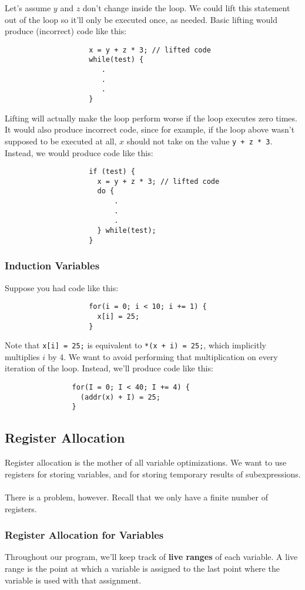 \documentclass[]{article}
\theoremstyle{definition}
\begin{document}
				Let's assume $y$ and $z$ don't change inside the loop. We could lift this statement out of the loop so it'll only be executed once, as needed. Basic lifting would produce (incorrect) code like this:
				\begin{verbatim}
					x = y + z * 3; // lifted code
					while(test) {
					   .
					   .
					   .
					}
				\end{verbatim}

				Lifting will actually make the loop perform worse if the loop executes zero times. It would also produce incorrect code, since for example, if the loop above wasn't supposed to be executed at all, $x$ should not take on the value \verb|y + z * 3|. Instead, we would produce code like this:
				\begin{verbatim}
					if (test) {
					  x = y + z * 3; // lifted code
					  do {
						  .
						  .
						  .
					  } while(test);
					}
				\end{verbatim}
			\subsubsection{Induction Variables}
				Suppose you had code like this:
				\begin{verbatim}
					for(i = 0; i < 10; i += 1) {
					  x[i] = 25;
					}
				\end{verbatim}
				
				Note that \verb|x[i] = 25;| is equivalent to \verb|*(x + i) = 25;|, which implicitly multiplies $i$ by 4. We want to avoid performing that multiplication on every iteration of the loop. Instead, we'll produce code like this:
			\begin{verbatim}
				for(I = 0; I < 40; I += 4) {
				  (addr(x) + I) = 25;
				}
			\end{verbatim}
			
		\subsection{Register Allocation}
			Register allocation is the mother of all variable optimizations. We want to use registers for storing variables, and for storing temporary results of subexpressions.
			\\ \\
			There is a problem, however. Recall that we only have a finite number of registers.
			
			\subsubsection{Register Allocation for Variables}
				Throughout our program, we'll keep track of \textbf{live ranges} of each variable. A live range is the point at which a variable is assigned to the last point where the variable is used with that assignment.
			
\end{document}
